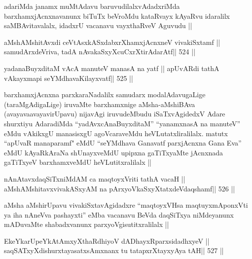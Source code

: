 \begin{artha}
adariMda janamx muMtAdavu baruvudilalxvAdadxriMda
barxhamxjAcnxnavanunx biTuTx beVroMdu kataRvayx kAyaRvu idaralilx
saMBAvitavalalx, idadxrU vacanavu vayxthaRveV Aguvudu ||
\end{artha}




\begin{shl}
aMshAMshitAvxdi ceVtAsxkASxdabxrXhamxjAcnxneV vivakiSxtamf ||
samudArxdeVriva, tadA nAvakaSxyXcuCxrXtirAdarAtf\hfill || 524 ||
\end{shl}

\begin{shl}
yadanaBuyxditaM vAcA manuteV manasA na yatf ||
apUvARdi tathA vAkayxmapi seYMdhavaKilayxvatf\hfill || 525 ||
\end{shl}

\begin{artha}
barxhamxjAcnxna parxkaraNadalilx samudarx modalAdavugaLige
(taraMgAdigaLige) iruvaMte barxhamxnige aMsha-aMshiBAva 
(avayavaavayavirUpavu) nijavAgi iruvudeMbudu iSaTxvAgidedxV Adare shurxtiyu
AdaradiMda ``yadAvxcAnaBuyxditaM'' ``yanamxnasA na manuteV'' eMdu
vAkikxgU manasisxgU agoVcaraveMdu heVLutatxliralilalx. matutx ``apUvaR
manaparamf" eMdU ``seYMdhava Ganavatf parxjAcnxna Gana Eva'' eMdU
kAyaRkAraNa shUnayxveMdU upipxna gaTiTxyaMte jAcnxnada gaTiTxyeV
barxhamxveMdU heVLutitxralilalx || 
\end{artha}


\begin{shl}
nAnAtavxdaqSiTxniMdAM ca maqtoyxVriti tathA vacaH ||
aMshAMshitavxvivakASxyAM na pArxyoVkaSxyXtatxdeVdaqshamf\hfill || 526 ||
\end{shl}

\begin{artha}
aMsha aMshirUpavu vivakiSxtavAgidadxre ``maqtoyxVHsa maqtuyxmAponxVti
ya iha nAneVva pashayxti'' eMba vacanavu BeVda daqSiTxya niMdeyanunx
mADuvaMte shabadxvanunx parxyoVgisutitxralilalx ||
\end{artha}



\begin{shl}
EkeYkarUpeYkAtAmxyXthaRdhiyoV dADhayxRparxsidadhxyeV ||
saqSATxyXdishurxtayasatxsAmxnanx tu tatapxrXtayxyAya tAH\hfill || 527 ||
\end{shl}

